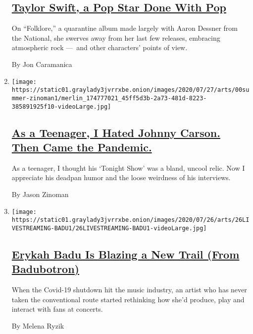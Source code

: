 \begin{enumerate}
  \hypertarget{taylor-swift-a-pop-star-done-with-pop}{%
  \subsection{\texorpdfstring{\href{/2020/07/26/arts/music/taylor-swift-folklore-review.html}{Taylor
  Swift, a Pop Star Done With
  Pop}}{Taylor Swift, a Pop Star Done With Pop}}\label{taylor-swift-a-pop-star-done-with-pop}}

  On ``Folklore,'' a quarantine album made largely with Aaron Dessner
  from the National, she swerves away from her last few releases,
  embracing atmospheric rock ---~and other characters' points of view.

  By Jon Caramanica
\item
  \texttt{[image: https://static01.graylady3jvrrxbe.onion/images/2020/07/27/arts/00summer-zinoman1/merlin\_174777021\_45ff5d3b-2a73-481d-8223-385891925f10-videoLarge.jpg]}

  \hypertarget{as-a-teenager-i-hated-johnny-carson-then-came-the-pandemic}{%
  \subsection{\texorpdfstring{\href{/2020/07/26/arts/television/johnny-carson-tonight-show.html}{As
  a Teenager, I Hated Johnny Carson. Then Came the
  Pandemic.}}{As a Teenager, I Hated Johnny Carson. Then Came the Pandemic.}}\label{as-a-teenager-i-hated-johnny-carson-then-came-the-pandemic}}

  As a teenager, I thought his `Tonight Show' was a bland, uncool relic.
  Now I appreciate his deadpan humor and the loose weirdness of his
  interviews.

  By Jason Zinoman
\item
  \texttt{[image: https://static01.graylady3jvrrxbe.onion/images/2020/07/26/arts/26LIVESTREAMING-BADU1/26LIVESTREAMING-BADU1-videoLarge.jpg]}

  \hypertarget{erykah-badu-is-blazing-a-new-trail-from-badubotron}{%
  \subsection{\texorpdfstring{\href{/2020/07/21/arts/music/erykah-badu-livestreams.html}{Erykah
  Badu Is Blazing a New Trail (From
  Badubotron)}}{Erykah Badu Is Blazing a New Trail (From Badubotron)}}\label{erykah-badu-is-blazing-a-new-trail-from-badubotron}}

  When the Covid-19 shutdown hit the music industry, an artist who has
  never taken the conventional route started rethinking how she'd
  produce, play and interact with fans at concerts.

  By Melena Ryzik
\end{enumerate}

